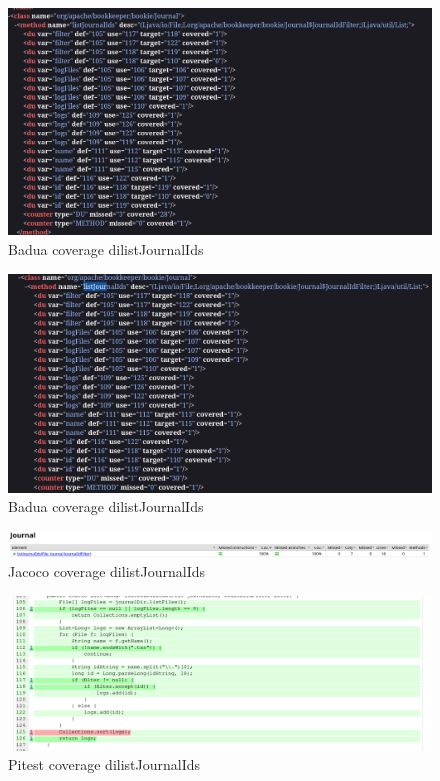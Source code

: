 \documentclass[12pt, a4paper]{article}
\begin{document}
  \begin{figure}
    \includegraphics[width=\linewidth]{./images/journal/BaduaCoveragelistJournalIds1.png}
    \caption{Badua coverage dilistJournalIds}
    \label{fig:listJournalIds_badua}
  \end{figure}

  \begin{figure}
    \includegraphics[width=\linewidth]{./images/journal/BaduaCoveragelistJournalIds2.png}
    \caption{Badua coverage dilistJournalIds}
    \label{fig:listJournalIds_badua2}
  \end{figure}

  \begin{figure}
    \includegraphics[width=\linewidth]{./images/journal/JacocoCoveragelistJournalIds3.png}
    \caption{Jacoco coverage dilistJournalIds}
    \label{fig:listJournalIds_jacoco4}
  \end{figure}

  \begin{figure}
    \includegraphics[width=\linewidth]{./images/journal/PitCoverageListJournalIds1.png}
    \caption{Pitest coverage dilistJournalIds}
    \label{fig:listJournalIds_pitest}
  \end{figure}
\end{document}
